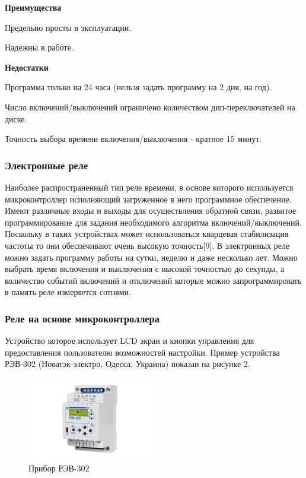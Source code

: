 \textbf{Преимущества}
\begin{my_enumerate}
\item Предельно просты в эксплуатации.
\item Надежны в работе.
\end{my_enumerate}

\textbf{Недостатки}
\begin{my_enumerate}
\item Программа только на 24 часа (нельзя задать программу на 2 дня, на год).
\item Число включений/выключений ограничено количеством дип-переключателей на диске.
\item Точность выбора времени включения/выключения - кратное 15 минут.
\end{my_enumerate}


\subsubsection{Электронные реле}
Наиболее распространенный тип реле времени, в основе которого используется микроконтроллер исполняющий загруженное в него программное обеспечение. Имеют различные входы и выходы для осуществления обратной связи, развитое программирование для задания необходимого алгоритма включений/выключений.  Поскольку в таких устройствах может использоваться кварцевая стабилизация частоты то они обеспечивают очень высокую точность[9]. В электронных реле можно задать программу работы на сутки, неделю и даже несколько лет. Можно выбрать время включения и выключения с высокой точностью до секунды, а количество событий включений и отключений которые можно запрограммировать в память реле измеряется сотнями. 

\subsubsection*{Реле на основе микроконтроллера}

Устройство которое использует LCD экран и кнопки управления для предоставления пользователю возможностей настройки.
Пример устройства РЭВ-302 (Новатэк-электро, Одесса, Украина) показан на рисунке 2.

\begin{figure}[h!]
    \centering
    \includegraphics[width=0.5\textwidth]{rev302.png}
    \caption{Прибор РЭВ-302}
\end{figure}


